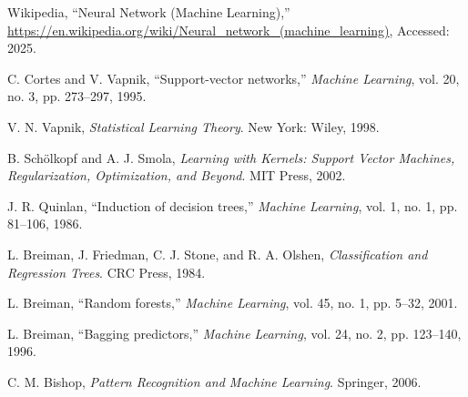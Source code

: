 \documentclass[UTF8]{report}
\theoremstyle{MyLineTheoremStyle} %
\theoremstyle{MyBlockTheoremStyle} %
\theoremstyle{MySubsubsectionStyle} %
\begin{document}
\begin{thebibliography}{99}
Wikipedia, ``Neural Network (Machine Learning),'' \url{https://en.wikipedia.org/wiki/Neural_network_(machine_learning)}, Accessed: 2025.

C. Cortes and V. Vapnik, ``Support-vector networks,'' \textit{Machine Learning}, vol. 20, no. 3, pp. 273--297, 1995.

V. N. Vapnik, \textit{Statistical Learning Theory}. New York: Wiley, 1998.

B. Schölkopf and A. J. Smola, \textit{Learning with Kernels: Support Vector Machines, Regularization, Optimization, and Beyond}. MIT Press, 2002.

J. R. Quinlan, ``Induction of decision trees,'' \textit{Machine Learning}, vol. 1, no. 1, pp. 81--106, 1986.

L. Breiman, J. Friedman, C. J. Stone, and R. A. Olshen, \textit{Classification and Regression Trees}. CRC Press, 1984.

L. Breiman, ``Random forests,'' \textit{Machine Learning}, vol. 45, no. 1, pp. 5--32, 2001.

L. Breiman, ``Bagging predictors,'' \textit{Machine Learning}, vol. 24, no. 2, pp. 123--140, 1996.

C. M. Bishop, \textit{Pattern Recognition and Machine Learning}. Springer, 2006.


\end{thebibliography}
\end{document}
